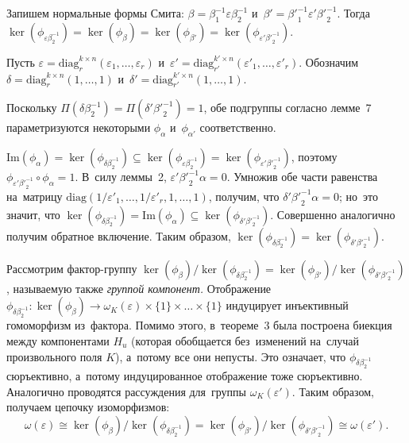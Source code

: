 \documentclass[twoside]{article}
\begin{document}
    Запишем нормальные формы Смита: $\beta = \beta_1^{-1} \varepsilon \beta_2^{-1}$
    и~$\beta' = {\beta'}_1^{-1} \varepsilon' {\beta'}_2^{-1}$.
    Тогда $\ker(\phi_{\varepsilon \beta_2^{-1}}) = \ker(\phi_{\beta}) = \ker(\phi_{\beta'}) = \ker(\phi_{\varepsilon' {\beta'}_2^{-1}})$.

    Пусть $\varepsilon = \mathrm{diag}^{k \times n}_r(\varepsilon_1, \ldots, \varepsilon_r)$
    и~$\varepsilon' = \mathrm{diag}^{k' \times n}_{r'}(\varepsilon'_1, \ldots, \varepsilon'_r)$.
    Обозначим $\delta = \mathrm{diag}^{k \times n}_r(1, \ldots, 1)$ и~$\delta' = \mathrm{diag}^{k' \times n}_{r'}(1, \ldots, 1)$.

    Поскольку $\Pi(\delta \beta_2^{-1}) = \Pi(\delta' {\beta'}_2^{-1}) = 1$, обе подгруппы согласно лемме~7
    параметризуются некоторыми $\phi_\alpha$ и~$\phi_{\alpha'}$ соответственно.

    $\mathrm{Im}(\phi_\alpha) = \ker(\phi_{\delta \beta_2^{-1}}) \subseteq \ker(\phi_{\varepsilon \beta_2^{-1}}) = \ker(\phi_{\varepsilon' {\beta'}_2^{-1}})$,
    поэтому $\phi_{\varepsilon' {\beta'}_2^{-1}} \circ \phi_\alpha = 1$.
    В~силу леммы~2, $\varepsilon' {\beta'}_2^{-1} \alpha = 0$.
    Умножив обе части равенства на~матрицу
    $\mathrm{diag}(1 / \varepsilon'_1, \ldots, 1 / \varepsilon'_r, 1, \ldots, 1)$, получим, что $\delta' {\beta'}_2^{-1} \alpha = 0$;
    но~это значит, что $\ker(\phi_{\delta \beta_2^{-1}}) = \mathrm{Im}(\phi_\alpha) \subseteq \ker(\phi_{\delta' {\beta'}_2^{-1}})$.
    Совершенно аналогично получим обратное включение. Таким образом, $\ker(\phi_{\delta \beta_2^{-1}}) = \ker(\phi_{\delta' {\beta'}_2^{-1}})$.

    Рассмотрим фактор-группу $\ker(\phi_\beta) / \ker(\phi_{\delta \beta_2^{-1}}) = \ker(\phi_{\beta'}) / \ker(\phi_{\delta' {\beta'}_2^{-1}})$,
    называемую также \textit{группой компонент.}
    Отображение $\phi_{\delta \beta_2^{-1}} : \ker(\phi_\beta) \rightarrow \omega_K(\varepsilon) \times \{ 1 \} \times \ldots \times \{ 1 \}$
    индуцирует инъективный гомоморфизм из~фактора. Помимо этого, в~теореме~3 была построена биекция между компонентами $H_u$ (которая обобщается
    без~изменений на~случай произвольного поля $K$), а~потому все они непусты.
    Это означает, что $\phi_{\delta \beta_2^{-1}}$ сюръективно, а~потому индуцированное отображение тоже сюръективно.
    Аналогично проводятся рассуждения для~группы $\omega_K(\varepsilon')$.
    Таким образом, получаем цепочку изоморфизмов:
    $$
        \omega(\varepsilon) \cong \ker(\phi_\beta) / \ker(\phi_{\delta \beta_2^{-1}}) = \ker(\phi_{\beta'}) / \ker(\phi_{\delta' {\beta'}_2^{-1}}) \cong \omega(\varepsilon').
    $$
\end{document}
